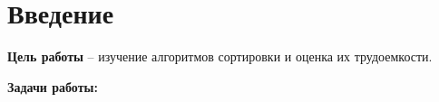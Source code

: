 \chapter*{Введение}
\textbf{Цель работы} – изучение алгоритмов сортировки и оценка их трудоемкости.

\textbf{Задачи работы:}
